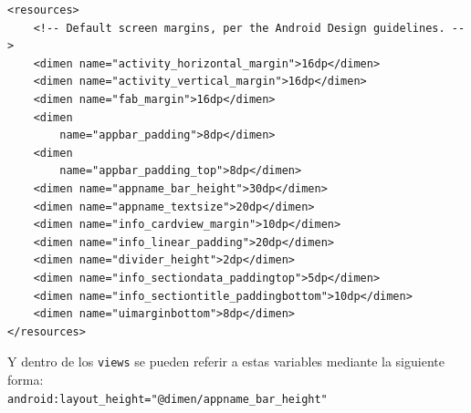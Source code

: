 \begin{verbatim}
<resources>
    <!-- Default screen margins, per the Android Design guidelines. -->
    <dimen name="activity_horizontal_margin">16dp</dimen>
    <dimen name="activity_vertical_margin">16dp</dimen>
    <dimen name="fab_margin">16dp</dimen>
    <dimen 
        name="appbar_padding">8dp</dimen>
    <dimen 
        name="appbar_padding_top">8dp</dimen>
    <dimen name="appname_bar_height">30dp</dimen>
    <dimen name="appname_textsize">20dp</dimen>
    <dimen name="info_cardview_margin">10dp</dimen>
    <dimen name="info_linear_padding">20dp</dimen>
    <dimen name="divider_height">2dp</dimen>
    <dimen name="info_sectiondata_paddingtop">5dp</dimen>
    <dimen name="info_sectiontitle_paddingbottom">10dp</dimen>
    <dimen name="uimarginbottom">8dp</dimen>
</resources>
\end{verbatim}

Y dentro de los \texttt{views} se pueden referir a estas variables mediante la siguiente forma: \\

\texttt{android:layout\_height="@dimen/appname\_bar\_height"}